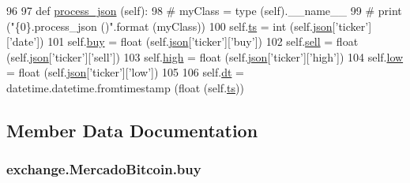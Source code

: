 \begin{DoxyCode}
96 
97     \textcolor{keyword}{def }\hyperlink{classexchange_1_1_mercado_bitcoin_a265e83673337b0b06cb4566ee0903e2f}{process\_json} (self):
98 \textcolor{comment}{#        myClass = type (self).\_\_name\_\_}
99 \textcolor{comment}{#        print ("\{0\}.process\_json ()".format (myClass))}
100         self.\hyperlink{classexchange_1_1_mercado_bitcoin_ac4630b08e08f9eeb9dad838dc9dc0cda}{ts}   = int   (self.\hyperlink{classexchange_1_1_exchange_a6ce8e0779d98031b1cd9200d2a0fa5ad}{json}[\textcolor{stringliteral}{'ticker'}][\textcolor{stringliteral}{'date'}])
101         self.\hyperlink{classexchange_1_1_mercado_bitcoin_ada27b62a35286b9f5dbb54590c5bacd2}{buy}  = float (self.\hyperlink{classexchange_1_1_exchange_a6ce8e0779d98031b1cd9200d2a0fa5ad}{json}[\textcolor{stringliteral}{'ticker'}][\textcolor{stringliteral}{'buy'}])
102         self.\hyperlink{classexchange_1_1_mercado_bitcoin_a9982c7a3f6103c88c64160a5854c35cd}{sell} = float (self.\hyperlink{classexchange_1_1_exchange_a6ce8e0779d98031b1cd9200d2a0fa5ad}{json}[\textcolor{stringliteral}{'ticker'}][\textcolor{stringliteral}{'sell'}])
103         self.\hyperlink{classexchange_1_1_mercado_bitcoin_a0b9c2d465601a48e3b8838354e931c39}{high} = float (self.\hyperlink{classexchange_1_1_exchange_a6ce8e0779d98031b1cd9200d2a0fa5ad}{json}[\textcolor{stringliteral}{'ticker'}][\textcolor{stringliteral}{'high'}])
104         self.\hyperlink{classexchange_1_1_mercado_bitcoin_aaa3aae824bfc5ba3b7dc5252e9554713}{low}  = float (self.\hyperlink{classexchange_1_1_exchange_a6ce8e0779d98031b1cd9200d2a0fa5ad}{json}[\textcolor{stringliteral}{'ticker'}][\textcolor{stringliteral}{'low'}])
105     
106         self.\hyperlink{classexchange_1_1_mercado_bitcoin_aeee983ba4f72223a11fb914d22902c56}{dt} = datetime.datetime.fromtimestamp (float (self.\hyperlink{classexchange_1_1_mercado_bitcoin_ac4630b08e08f9eeb9dad838dc9dc0cda}{ts}))
    
\end{DoxyCode}


\subsection{Member Data Documentation}
\hypertarget{classexchange_1_1_mercado_bitcoin_ada27b62a35286b9f5dbb54590c5bacd2}{
\subsubsection[{buy}]{\setlength{\rightskip}{0pt plus 5cm}exchange.\-Mercado\-Bitcoin.\-buy}}\label{classexchange_1_1_mercado_bitcoin_ada27b62a35286b9f5dbb54590c5bacd2}


